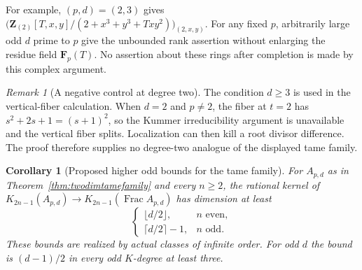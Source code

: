 \documentclass[11pt,a4paper]{article}
\newtheorem{corollary}[theorem]{Corollary}
\theoremstyle{remark}
\newtheorem{remark}[theorem]{Remark}
\newcommand{\Z}{\mathbf Z}
\newcommand{\F}{\mathbf F}
\newcommand{\Frac}{\operatorname{Frac}}
\begin{document}
For example, $(p,d)=(2,3)$ gives
$\bigl(\Z_{(2)}[T,x,y]/(2+x^3+y^3+Txy^2)\bigr)_{(2,x,y)}$.
For any fixed $p$, arbitrarily large odd $d$ prime to $p$ give
the unbounded rank assertion without enlarging the residue
field $\F_p(T)$. No assertion about these rings after completion
is made by this complex argument.

\begin{remark}[A negative control at degree two]
The condition $d\ge3$ is used in the vertical-fiber calculation.
When $d=2$ and $p\ne2$, the fiber at $t=2$ has
$s^2+2s+1=(s+1)^2$, so the Kummer irreducibility argument is
unavailable and the vertical fiber splits. Localization can then
kill a root divisor difference. The proof therefore supplies no
degree-two analogue of the displayed tame family.
\end{remark}



\begin{corollary}[Proposed higher odd bounds for the tame family]
\label{cor:twodimtameallodd}
For $A_{p,d}$ as in Theorem~\ref{thm:twodimtamefamily} and every
$n\ge2$, the rational kernel of
$K_{2n-1}(A_{p,d})\to K_{2n-1}(\Frac A_{p,d})$ has dimension at least
\[
 \begin{cases}
 \lfloor d/2\rfloor,&n\text{ even},\\
 \lceil d/2\rceil-1,&n\text{ odd}.
 \end{cases}
\]
These bounds are realized by actual classes of infinite order.
For odd $d$ the bound is $(d-1)/2$ in every odd $K$-degree at least three.
\end{corollary}
\end{document}

